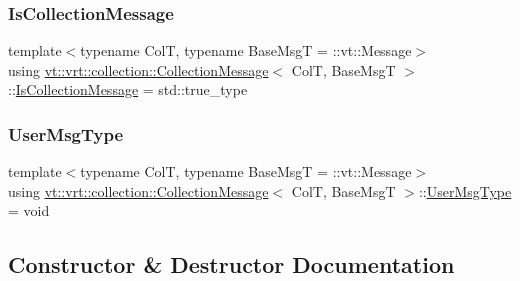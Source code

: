 \subsubsection{\texorpdfstring{Is\+Collection\+Message}{IsCollectionMessage}}
{\footnotesize\ttfamily template$<$typename ColT, typename Base\+MsgT = \+::vt\+::\+Message$>$ \\
using \hyperlink{structvt_1_1vrt_1_1collection_1_1_collection_message}{vt\+::vrt\+::collection\+::\+Collection\+Message}$<$ ColT, Base\+MsgT $>$\+::\hyperlink{structvt_1_1vrt_1_1collection_1_1_collection_message_a186fceb015a3415a482d99851432222b}{Is\+Collection\+Message} =  std\+::true\+\_\+type}

\mbox{\label{structvt_1_1vrt_1_1collection_1_1_collection_message_ace5b4eaa94f5b209ae321edd6c0b6c19}} 
\subsubsection{\texorpdfstring{User\+Msg\+Type}{UserMsgType}}
{\footnotesize\ttfamily template$<$typename ColT, typename Base\+MsgT = \+::vt\+::\+Message$>$ \\
using \hyperlink{structvt_1_1vrt_1_1collection_1_1_collection_message}{vt\+::vrt\+::collection\+::\+Collection\+Message}$<$ ColT, Base\+MsgT $>$\+::\hyperlink{structvt_1_1vrt_1_1collection_1_1_collection_message_ace5b4eaa94f5b209ae321edd6c0b6c19}{User\+Msg\+Type} =  void}



\subsection{Constructor \& Destructor Documentation}
\mbox{\label{structvt_1_1vrt_1_1collection_1_1_collection_message_a67157cfe91f1138728cf8c4ea14a0778}} 
